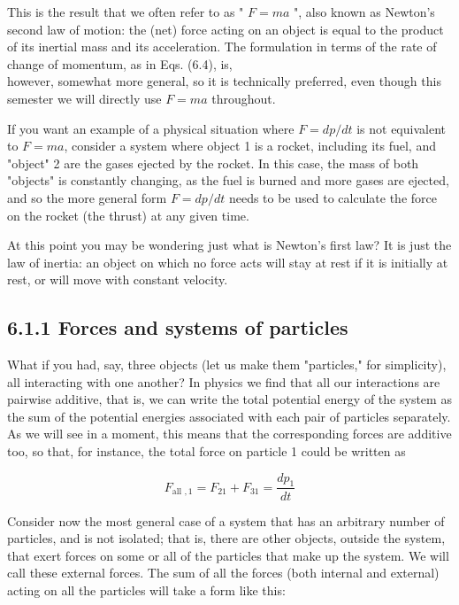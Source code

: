 \documentclass[10pt]{article}
\begin{document}
This is the result that we often refer to as " $F=m a$ ", also known as Newton's second law of motion: the (net) force acting on an object is equal to the product of its inertial mass and its acceleration. The formulation in terms of the rate of change of momentum, as in Eqs. (6.4), is,\\
however, somewhat more general, so it is technically preferred, even though this semester we will directly use $F=m a$ throughout.

If you want an example of a physical situation where $F=d p / d t$ is not equivalent to $F=m a$, consider a system where object 1 is a rocket, including its fuel, and "object" 2 are the gases ejected by the rocket. In this case, the mass of both "objects" is constantly changing, as the fuel is burned and more gases are ejected, and so the more general form $F=d p / d t$ needs to be used to calculate the force on the rocket (the thrust) at any given time.

At this point you may be wondering just what is Newton's first law? It is just the law of inertia: an object on which no force acts will stay at rest if it is initially at rest, or will move with constant velocity.

\subsection*{6.1.1 Forces and systems of particles}
What if you had, say, three objects (let us make them "particles," for simplicity), all interacting with one another? In physics we find that all our interactions are pairwise additive, that is, we can write the total potential energy of the system as the sum of the potential energies associated with each pair of particles separately. As we will see in a moment, this means that the corresponding forces are additive too, so that, for instance, the total force on particle 1 could be written as


\begin{equation*}
F_{\text {all }, 1}=F_{21}+F_{31}=\frac{d p_{1}}{d t} \tag{6.7}
\end{equation*}


Consider now the most general case of a system that has an arbitrary number of particles, and is not isolated; that is, there are other objects, outside the system, that exert forces on some or all of the particles that make up the system. We will call these external forces. The sum of all the forces (both internal and external) acting on all the particles will take a form like this:
\end{document}
